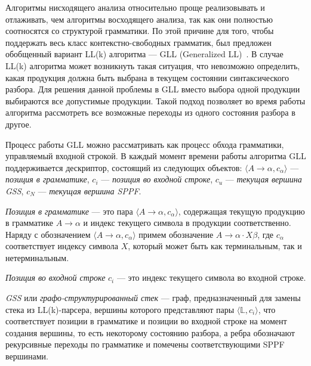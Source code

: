 Алгоритмы нисходящего анализа относительно проще реализовывать и отлаживать, чем алгоритмы восходящего анализа, так как они полностью соотносятся со структурой грамматики.
По этой причине для того, чтобы поддержать весь класс контекстно-свободных грамматик, был предложен обобщенный вариант LL(k) алгоритма --- GLL (Generalized LL)~\cite{intro}. 
В случае LL(k) алгоритма может возникнуть такая ситуация, что невозможно определить, какая продукция должна быть выбрана в текущем состоянии синтаксического разбора.
Для решения данной проблемы в GLL вместо выбора одной продукции выбираются все допустимые продукции.
Такой подход позволяет во время работы алгоритма рассмотреть все возможные переходы из одного состояния разбора в другое.

Процесс работы GLL можно рассматривать как процесс обхода грамматики, управляемый входной строкой.
В каждый момент времени работы алгоритма GLL поддерживается дескриптор, состоящий из следующих объектов: $\langle A \rightarrow \alpha, c_{\alpha} \rangle$ --- \emph{позиция в грамматике}, $c_{i}$ --- \emph{позиция во входной строке}, $c_{u}$ --- \emph{текущая вершина GSS}, $c_{N}$ --- \emph{текущая вершина SPPF}.

\begin{rudefinition}
    \emph{Позиция в грамматике} --- это пара $\langle A \rightarrow \alpha, c_{\alpha} \rangle$, содержащая текущую продукцию в грамматике $A \rightarrow \alpha$ и индекс текущего символа в продукции соответственно.
    Наряду с обозначением $\langle A \rightarrow \alpha, c_{\alpha} \rangle$ примем обозначение $A \rightarrow \alpha \cdot X \beta$, где $c_{\alpha}$ соответствует индексу символа $X$, который может быть как терминальным, так и нетерминальным.
\end{rudefinition}

\begin{rudefinition}
    \emph{Позиция во входной строке} $c_{i}$ --- это индекс текущего символа во входной строке.
\end{rudefinition}

\begin{rudefinition}
    \emph{GSS} или \emph{графо-структурированный стек} --- граф, предназначенный для замены стека из LL(k)-парсера, вершины которого представляют пары $\langle \mathbb{L}, c_{i} \rangle$, что соответствует позиции в грамматике и позиции во входной строке на момент создания вершины, то есть некоторому состоянию разбора, а ребра обозначают рекурсивные переходы по грамматике и помечены соответствующими SPPF вершинами.
\end{rudefinition}

